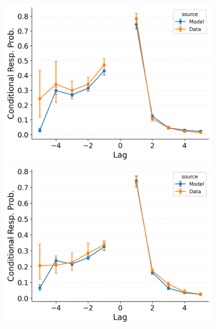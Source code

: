 \documentclass[
  man,
  floatsintext,
  longtable,
  nolmodern,
  notxfonts,
  notimes,
  draftfirst,
  colorlinks=true,linkcolor=blue,citecolor=blue,urlcolor=blue]{apa7}
\begin{document}
\begin{figure}
\begin{minipage}{0.33\linewidth}
\includegraphics{figures/Gordon2021_CRU_with_Pre-Expt_and_Primacy__and_ContextTerm_Confusable_Fitting_crp_LL6.png}\end{minipage}%
%
\begin{minipage}{0.33\linewidth}
\includegraphics{figures/Gordon2021_CRU_with_Pre-Expt_and_Primacy__and_ContextTerm_Confusable_Fitting_crp_LL7.png}\end{minipage}%
\newline
\begin{minipage}{0.33\linewidth}

\end{minipage}
\end{figure}
\end{document}
